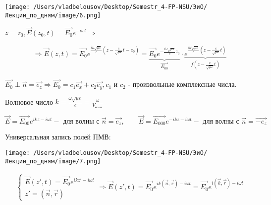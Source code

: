 \documentclass[12pt, a4paper]{report}
\begin{document}
\begin{minipage}{0.5\textwidth}
    \texttt{[image: /Users/vladbelousov/Desktop/Semestr\_4-FP-NSU/ЭиО/Лекции\_по\_дням/image/6.png]}
\end{minipage}
\begin{minipage}{0.5\textwidth}
     \( z = z_0 , \vec{E}( z_0,t )= \vec{E_0}e^{-i \omega t} \Rightarrow  \) 
\end{minipage}

\begin{gather*}
  \displaystyle  \Rightarrow  \vec{E}( z,t)= \vec{E_0} e^{\frac{i \omega \sqrt{ \mu \varepsilon}}{c} \left( z- \frac{c}{\sqrt{\mu \varepsilon}} t -z_0  \right) }= \underbrace{\vec{E_0}e^{-\frac{i \omega \sqrt{ \mu \varepsilon}}{c}z_0} }_{\vec{E_{00}}} \cdot \underbrace{e^{\frac{i \omega \sqrt{ \mu \varepsilon}}{c} \left( z - \frac{c}{\sqrt{ \mu \varepsilon}}t  \right)} } _{f (z - \frac{c}{\sqrt{ \mu \varepsilon}}t)}   
\end{gather*}

\( \vec{E_0 } \perp \vec{n} = \vec{e_z} \Rightarrow \vec{E_0}=c_1 \vec{e_x}+ c_2 \vec{e_y}, c_1 \text{ и } c_2   \) - произвольные комплексные числа. 

\begin{definition}
    Волновое число \( k = \frac{\omega \sqrt{ \mu \varepsilon}}{c} = \frac{\omega}{V_{\text{волн.} } }   \) 
\end{definition}

\[ \displaystyle \vec{E}= \vec{E_{00}}e^{ikz- i \omega t } - \text{ для волны с } \vec{n} = \vec{e_z}, \qquad \vec{E}= \vec{E_{000}}e^{-ikz- i \omega t } - \text{ для волны с } \vec{n} = \vec{-e_z}  \] 

Универсальная запись полей ПМВ: 

\begin{center}
    \texttt{[image: /Users/vladbelousov/Desktop/Semestr\_4-FP-NSU/ЭиО/Лекции\_по\_дням/image/7.png]}
\end{center}

\[ \begin{aligned}
    \begin{cases}
        \vec{E}( z', t)= \vec{E_0 }e^{ikz' - i \omega t } \\  
        z'= (\vec{n}, \vec{r})
    \end{cases}
    \Rightarrow
    \vec{E}( z', t)= \vec{E_0}e^{ik(\vec{n}, \vec{r}) - i \omega t }= \vec{E_0}e^{i(\vec{k}, \vec{r}) - i \omega t }
\end{aligned} \] 

\ifdefined\mainfile
\else
    
\end{document}
